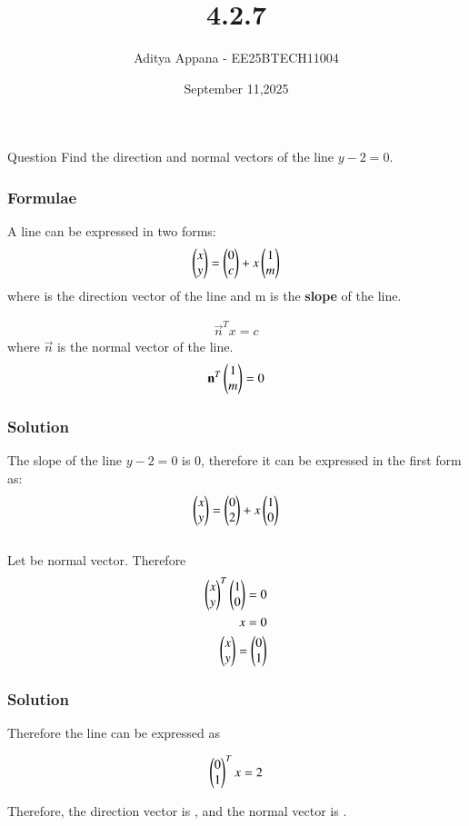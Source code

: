 \documentclass{beamer}
\title %
{4.2.7}
\date{September 11,2025}
\author %
{Aditya Appana - EE25BTECH11004}
\begin{document}
\frame{\titlepage}
\begin{frame}{Question}
Find the direction and normal vectors of the line $y-2=0$.
\end{frame}



\begin{frame}[fragile]
    \frametitle{Formulae}

A line can be expressed in two forms:
\begin{align}
\begin{pmatrix}x\\y\end{pmatrix} = \begin{pmatrix}0\\c\end{pmatrix} + x\begin{pmatrix}1\\m\end{pmatrix}
\end{align}
where  is the direction vector of the line and m is the \textbf{slope} of the line.

\begin{align}
{\vec{n}}^{T}x = c
\end{align}
where $\vec{n}$ is the normal vector of the line. \begin{align}{\mathbf{n}}^T\begin{pmatrix}1\\m\end{pmatrix} = 0\end{align}
\end{frame}


\begin{frame}[fragile]
    \frametitle{Solution}

The slope of the line $y-2=0$ is 0, therefore it can be expressed in the first form as:
\begin{align}
\begin{pmatrix}x\\y\end{pmatrix} = \begin{pmatrix}0\\2\end{pmatrix} + x\begin{pmatrix}1\\0\end{pmatrix}
\end{align}\\

Let  be normal vector. Therefore
\begin{align}
\begin{pmatrix}x\\ y\end{pmatrix}^T\begin{pmatrix}1\\0\end{pmatrix} = 0 \\
x = 0\\
\begin{pmatrix}x\\y\end{pmatrix} = \begin{pmatrix}0\\1\end{pmatrix}
\end{align}

\end{frame}

\begin{frame}[fragile]
    \frametitle{Solution}
Therefore the line can be expressed as

\begin{align}
\begin{pmatrix}0\\1\end{pmatrix}^Tx=2
\end{align}

\vspace{1cm}


Therefore, the direction vector is  , and the normal vector is .

\end{frame}
\end{document}
